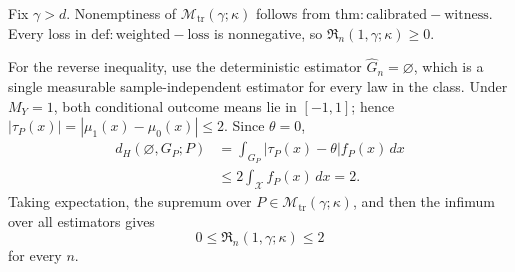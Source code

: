 Fix \(\gamma>d\). Nonemptiness of \(\mathcal M_{\mathrm{tr}}(\gamma;\kappa)\) follows from \(\mathrm{thm:calibrated-witness}\). Every loss in \(\mathrm{def:weighted-loss}\) is nonnegative, so \(\mathfrak R_n(1,\gamma;\kappa)\ge0\).

For the reverse inequality, use the deterministic estimator \(\widehat G_n=\varnothing\), which is a single measurable sample-independent estimator for every law in the class. Under \(M_Y=1\), both conditional outcome means lie in \([-1,1]\); hence \(|\tau_P(x)|=|\mu_1(x)-\mu_0(x)|\le2\). Since \(\theta=0\),
\[
\begin{aligned}
d_H(\varnothing,G_P;P)
&=\int_{G_P}|\tau_P(x)-\theta|f_P(x)\,dx\\
&\le2\int_{\mathcal X}f_P(x)\,dx
=2.
\end{aligned}
\]
Taking expectation, the supremum over \(P\in\mathcal M_{\mathrm{tr}}(\gamma;\kappa)\), and then the infimum over all estimators gives
\[
0\le\mathfrak R_n(1,\gamma;\kappa)\le2
\]
for every \(n\).